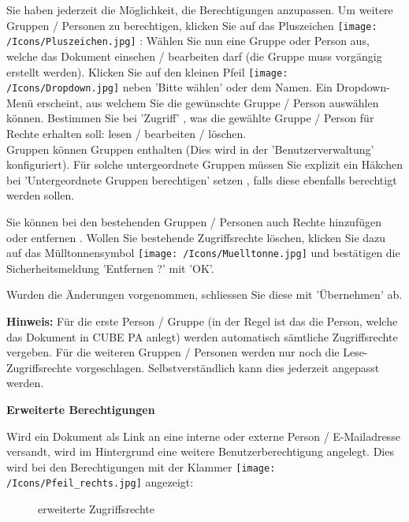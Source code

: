 Sie haben jederzeit die Möglichkeit, die Berechtigungen anzupassen. Um weitere Gruppen / Personen zu berechtigen, klicken Sie auf das Pluszeichen \texttt{[image: /Icons/Pluszeichen.jpg]} : Wählen Sie nun eine Gruppe oder Person aus, welche das Dokument einsehen / bearbeiten darf (die Gruppe muss vorgängig erstellt werden). Klicken Sie auf den kleinen Pfeil \texttt{[image: /Icons/Dropdown.jpg]} neben 'Bitte wählen' oder dem Namen. Ein Dropdown-Menü erscheint, aus welchem Sie die gewünschte Gruppe / Person auswählen können. Bestimmen Sie bei 'Zugriff' , was die gewählte Gruppe / Person für Rechte erhalten soll: lesen / bearbeiten / löschen.\\
Gruppen können Gruppen enthalten (Dies wird in der 'Benutzerverwaltung' konfiguriert). Für solche untergeordnete Gruppen müssen Sie explizit ein Häkchen bei 'Untergeordnete Gruppen berechtigen' setzen , falls diese ebenfalls berechtigt werden sollen.

\vspace{\baselineskip}

Sie können bei den bestehenden Gruppen / Personen auch Rechte hinzufügen oder entfernen . Wollen Sie bestehende Zugriffsrechte löschen, klicken Sie dazu auf das Mülltonnensymbol \texttt{[image: /Icons/Muelltonne.jpg]}  und bestätigen die Sicherheitsmeldung 'Entfernen ?' mit 'OK'.  \newline

Wurden die Änderungen vorgenommen, schliessen Sie diese mit 'Übernehmen' ab. 

\vspace{\baselineskip}

\textbf{Hinweis:} Für die erste Person / Gruppe (in der Regel ist das die Person, welche das Dokument in CUBE PA anlegt) werden automatisch sämtliche Zugriffsrechte vergeben. Für die weiteren Gruppen / Personen werden nur noch die Lese-Zugriffsrechte vorgeschlagen. Selbstverständlich kann dies jederzeit angepasst werden.

\vspace{\baselineskip}

\textbf{Erweiterte Berechtigungen}

Wird ein Dokument als Link an eine interne oder externe Person / E-Mailadresse versandt, wird im Hintergrund eine weitere Benutzerberechtigung angelegt. Dies wird bei den Berechtigungen mit der Klammer \texttt{[image: /Icons/Pfeil\_rechts.jpg]}  angezeigt:

\begin{figure}[H]
\caption{erweiterte Zugriffsrechte}
\end{figure}

